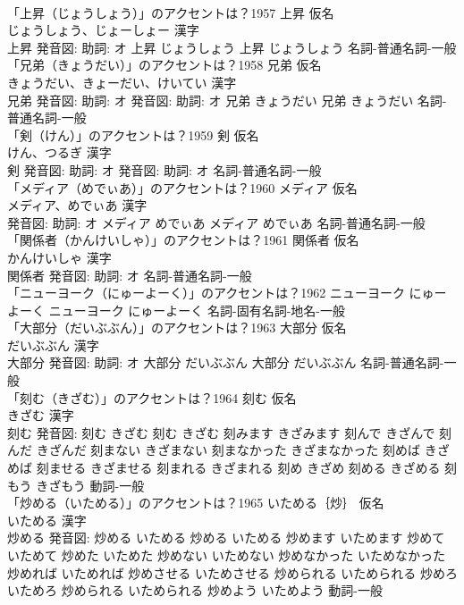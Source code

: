 \documentclass[8pt]{extreport}
\begin{document}
\begin{CJK}{UTF8}{min}
\\	「上昇（じょうしょう）」のアクセントは？1957	上昇 仮名　
\\	じょうしょう、じょーしょー 漢字　
\\	上昇 発音図: 助詞: オ	上昇 じょうしょう		上昇 じょうしょう				名詞-普通名詞-一般 
\\	「兄弟（きょうだい）」のアクセントは？1958	兄弟 仮名　
\\	きょうだい、きょーだい、けいてい 漢字　
\\	兄弟 発音図: 助詞: オ 発音図: 助詞: オ	兄弟 きょうだい		兄弟 きょうだい				名詞-普通名詞-一般 
\\	「剣（けん）」のアクセントは？1959	剣 仮名　
\\	けん、つるぎ 漢字　
\\	剣 発音図: 助詞: オ 発音図: 助詞: オ							名詞-普通名詞-一般 
\\	「メディア（めでぃあ）」のアクセントは？1960	メディア 仮名　
\\	メディア、めでぃあ 漢字　
\\	発音図: 助詞: オ	メディア めでぃあ		メディア めでぃあ				名詞-普通名詞-一般 
\\	「関係者（かんけいしゃ）」のアクセントは？1961	関係者 仮名　
\\	かんけいしゃ 漢字　
\\	関係者 発音図: 助詞: オ							名詞-普通名詞-一般 
\\	「ニューヨーク（にゅーよーく）」のアクセントは？1962		ニューヨーク にゅーよーく		ニューヨーク にゅーよーく				名詞-固有名詞-地名-一般 
\\	「大部分（だいぶぶん）」のアクセントは？1963	大部分 仮名　
\\	だいぶぶん 漢字　
\\	大部分 発音図: 助詞: オ	大部分 だいぶぶん		大部分 だいぶぶん				名詞-普通名詞-一般 
\\	「刻む（きざむ）」のアクセントは？1964	刻む 仮名　
\\	きざむ 漢字　
\\	刻む 発音図:	刻む きざむ		刻む きざむ 刻みます きざみます 刻んで きざんで 刻んだ きざんだ 刻まない きざまない 刻まなかった きざまなかった 刻めば きざめば 刻ませる きざませる 刻まれる きざまれる 刻め きざめ 刻める きざめる 刻もう きざもう				動詞-一般 
\\	「炒める（いためる）」のアクセントは？1965	いためる｛炒｝ 仮名　
\\	いためる 漢字　
\\	炒める 発音図:	炒める いためる		炒める いためる 炒めます いためます 炒めて いためて 炒めた いためた 炒めない いためない 炒めなかった いためなかった 炒めれば いためれば 炒めさせる いためさせる 炒められる いためられる 炒めろ いためろ 炒められる いためられる 炒めよう いためよう				動詞-一般 

\end{CJK}
\end{document}
